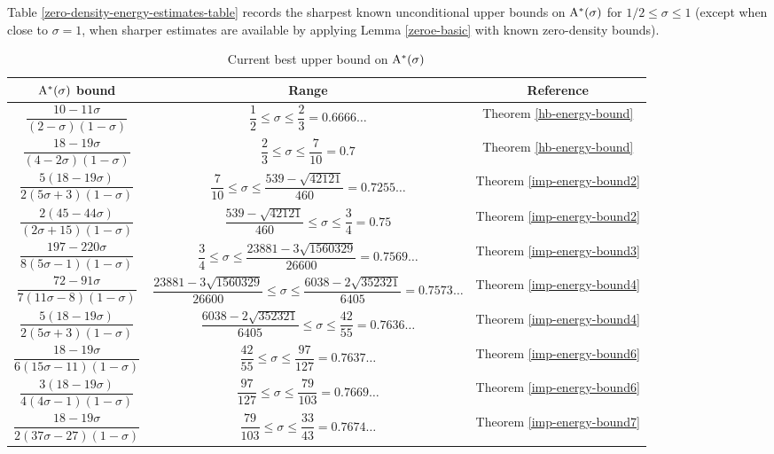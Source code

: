 Table \ref{zero-density-energy-estimates-table} records the sharpest known unconditional upper bounds on $\mathrm{A}^*(\sigma)$ for $1/2 \le \sigma \le 1$ (except when close to $\sigma = 1$, when sharper estimates are available by applying Lemma \ref{zeroe-basic} with known zero-density bounds).
\begin{table}[ht]
    \def\arraystretch{2}
    \centering
    \caption{Current best upper bound on $\mathrm{A}^*(\sigma)$}
    \begin{tabular}{|c|c|c|}
    \hline
    $\mathrm{A}^*(\sigma)$ bound & Range & Reference\\
    \hline
    $\dfrac{10 - 11\sigma}{(2 - \sigma)(1 - \sigma)}$ & $\dfrac{1}{2} \leq \sigma \le \dfrac{2}{3} = 0.6666\ldots$ & Theorem \ref{hb-energy-bound}\\
    \hline
    $\dfrac{18 - 19\sigma}{(4 - 2\sigma)(1 - \sigma)}$ & $\dfrac{2}{3} \leq \sigma \le \dfrac{7}{10} = 0.7$ & Theorem \ref{hb-energy-bound}\\
    \hline
    $\dfrac{5(18 - 19\sigma)}{2(5\sigma + 3)(1 - \sigma)}$ & $\dfrac{7}{10} \leq \sigma \le \dfrac{539 - \sqrt{42121}}{460} = 0.7255\ldots$ & Theorem \ref{imp-energy-bound2}\\
    \hline
    $\dfrac{2(45 - 44\sigma)}{(2\sigma + 15)(1 - \sigma)}$ & $\dfrac{539 - \sqrt{42121}}{460} \leq \sigma \le \dfrac{3}{4} = 0.75$ & Theorem \ref{imp-energy-bound2}\\
    \hline
    $\dfrac{197 - 220\sigma}{8(5\sigma - 1)(1 - \sigma)}$ & $\dfrac{3}{4} \leq \sigma \le \dfrac{23881 - 3 \sqrt{1560329}}{26600} = 0.7569\ldots$ & Theorem \ref{imp-energy-bound3}\\
    \hline
    $\dfrac{72 - 91\sigma}{7(11\sigma - 8)(1 - \sigma)}$ & $\dfrac{23881 - 3 \sqrt{1560329}}{26600} \leq \sigma \le \dfrac{6038 - 2\sqrt{352321}}{6405} = 0.7573\ldots$ & Theorem \ref{imp-energy-bound4}\\
    \hline
    $\dfrac{5(18 - 19\sigma)}{2(5\sigma + 3)(1 - \sigma)}$ & $\dfrac{6038 - 2\sqrt{352321}}{6405} \leq \sigma \le \dfrac{42}{55} = 0.7636\ldots$ & Theorem \ref{imp-energy-bound4}\\
    \hline
    $\dfrac{18 - 19\sigma}{6(15\sigma - 11)(1- \sigma)}$ & $\dfrac{42}{55} \leq \sigma \le \dfrac{97}{127} = 0.7637\ldots$ & Theorem \ref{imp-energy-bound6}\\
    \hline
    $\dfrac{3(18-19\sigma)}{4(4\sigma-1)(1 - \sigma)}$ & $\dfrac{97}{127} \leq \sigma \le \dfrac{79}{103} = 0.7669\ldots$ & Theorem \ref{imp-energy-bound6}\\
    \hline
    $\dfrac{18 - 19\sigma}{2(37\sigma - 27)(1 - \sigma)}$ & $\dfrac{79}{103} \leq \sigma \le \dfrac{33}{43} = 0.7674\ldots$ & Theorem \ref{imp-energy-bound7}\\

\end{tabular}
\end{table}
